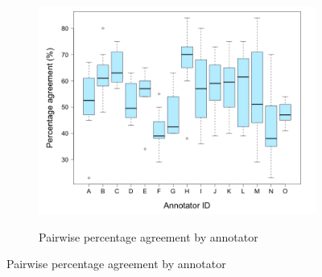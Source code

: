 		
		\begin{figure}[p]
			\centering
			
			

			

			
			\begin{subfigure}{\textwidth}
				\centering
				\caption{Pairwise percentage agreement by annotator}
				\includegraphics[width=\textwidth]{img/plots/pairwisePercentageByAnnotator-noTitle}
				\label{fig:agreement:annotators:pct}
			\end{subfigure}%

			\vspace{1em}			
			

\end{figure}
